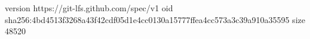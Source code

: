 version https://git-lfs.github.com/spec/v1
oid sha256:4bd4513f3268a43f42cdf05d1e4cc0130a15777ffea4cc573a3c39a910a35595
size 48520
